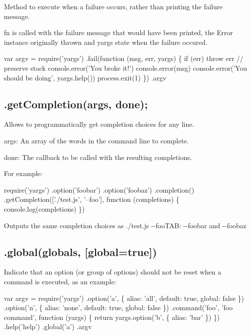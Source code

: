 Method to execute when a failure occurs, rather than printing the failure message.

{\ttfamily fn} is called with the failure message that would have been printed, the {\ttfamily Error} instance originally thrown and yargs state when the failure occured.


\begin{DoxyCode}
var argv = require('yargs')
  .fail(function (msg, err, yargs) \{
    if (err) throw err // preserve stack
    console.error('You broke it!')
    console.error(msg)
    console.error('You should be doing', yargs.help())
    process.exit(1)
  \})
  .argv
\end{DoxyCode}


\subsection*{.get\+Completion(args, done); }

Allows to programmatically get completion choices for any line.

{\ttfamily args}\+: An array of the words in the command line to complete.

{\ttfamily done}\+: The callback to be called with the resulting completions.

For example\+:


\begin{DoxyCode}
require('yargs')
  .option('foobar')
  .option('foobaz')
  .completion()
  .getCompletion(['./test.js', '--foo'], function (completions) \{
    console.log(completions)
  \})
\end{DoxyCode}


Outputs the same completion choices as {\ttfamily ./test.js -\/-\/foo}{\ttfamily T\+AB}\+: {\ttfamily -\/-\/foobar} and {\ttfamily -\/-\/foobaz}

\subsection*{\label{_global}%
.global(globals, \mbox{[}global=true\mbox{]}) }

Indicate that an option (or group of options) should not be reset when a command is executed, as an example\+:


\begin{DoxyCode}
var argv = require('yargs')
  .option('a', \{
    alias: 'all',
    default: true,
    global: false
  \})
  .option('n', \{
    alias: 'none',
    default: true,
    global: false
  \})
  .command('foo', 'foo command', function (yargs) \{
    return yargs.option('b', \{
      alias: 'bar'
    \})
  \})
  .help('help')
  .global('a')
  .argv
\end{DoxyCode}


